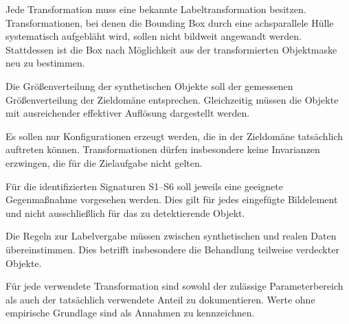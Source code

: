 \begin{description}[
  leftmargin=1.2em,
  itemsep=1pt,
  font=\normalfont\bfseries
]

  \item[A1 -- Labelexaktheit]
  Jede Transformation muss eine bekannte Labeltransformation besitzen. Transformationen, bei denen die Bounding Box durch eine achsparallele Hülle systematisch aufgebläht wird, sollen nicht bildweit angewandt werden. Stattdessen ist die Box nach Möglichkeit aus der transformierten Objektmaske neu zu bestimmen.

  \item[A2 -- Kalibrierte Skala]
  Die Größenverteilung der synthetischen Objekte soll der gemessenen Größenverteilung der Zieldomäne entsprechen. Gleichzeitig müssen die Objekte mit ausreichender effektiver Auflösung dargestellt werden.

  \item[A3 -- Physikalische Zulässigkeit]
  Es sollen nur Konfigurationen erzeugt werden, die in der Zieldomäne tatsächlich auftreten können. Transformationen dürfen insbesondere keine Invarianzen erzwingen, die für die Zielaufgabe nicht gelten.

  \item[A4 -- Geschlossene Abkürzungen]
  Für die identifizierten Signaturen S1--S6 soll jeweils eine geeignete Gegenmaßnahme vorgesehen werden. Dies gilt für jedes eingefügte Bildelement und nicht ausschließlich für das zu detektierende Objekt.

  \item[A5 -- Identische Labeldefinition]
  Die Regeln zur Labelvergabe müssen zwischen synthetischen und realen Daten übereinstimmen. Dies betrifft insbesondere die Behandlung teilweise verdeckter Objekte.

  \item[A6 -- Dokumentierte Verteilung]
  Für jede verwendete Transformation sind sowohl der zulässige Parameterbereich als auch der tatsächlich verwendete Anteil zu dokumentieren. Werte ohne empirische Grundlage sind als Annahmen zu kennzeichnen.

\end{description}
